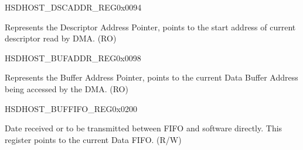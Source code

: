 \begin{register}{H}{SDHOST\_DSCADDR\_REG}{0x0094}\label{regdesc:SDHOSTDSCADDRREG}
%
\regnewline%
\begin{regdesc}\begin{reglist}
\label{fielddesc:SDHOSTDSCADDRREG}\item [SDHOST\_DSCADDR\_REG] Represents the Descriptor Address Pointer, points to the start address of current descriptor read by DMA. (RO)
\end{reglist}\end{regdesc}
\end{register}


\begin{register}{H}{SDHOST\_BUFADDR\_REG}{0x0098}\label{regdesc:SDHOSTBUFADDRREG}
%
\regnewline%
\begin{regdesc}\begin{reglist}
\label{fielddesc:SDHOSTBUFADDRREG}\item [SDHOST\_BUFADDR\_REG] Represents the Buffer Address Pointer, points to the current Data Buffer Address being accessed by the DMA. (RO)
\end{reglist}\end{regdesc}
\end{register}


\begin{register}{H}{SDHOST\_BUFFIFO\_REG}{0x0200}\label{regdesc:SDHOSTBUFFIFOREG}
%
\regnewline%
\begin{regdesc}\begin{reglist}
\label{fielddesc:SDHOSTBUFFIFOREG}\item [SDHOST\_BUFFIFO\_REG] Date received
 or to be transmitted between FIFO and software directly. This register points to the current Data FIFO. (R/W)
\end{reglist}\end{regdesc}
\end{register}